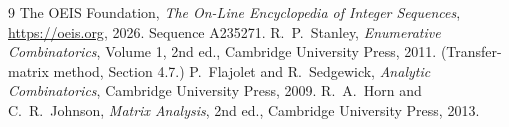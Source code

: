 \documentclass[11pt,a4paper]{article}
\theoremstyle{plain}
\theoremstyle{definition}
\begin{document}
\begin{thebibliography}{9}
 The OEIS Foundation, \emph{The On-Line Encyclopedia of Integer
Sequences}, \url{https://oeis.org}, 2026. Sequence A235271.
 R.~P.~Stanley, \emph{Enumerative Combinatorics}, Volume 1, 2nd ed.,
Cambridge University Press, 2011. (Transfer-matrix method, Section 4.7.)
 P.~Flajolet and R.~Sedgewick, \emph{Analytic Combinatorics}, Cambridge
University Press, 2009.
 R.~A.~Horn and C.~R.~Johnson, \emph{Matrix Analysis}, 2nd ed., Cambridge
University Press, 2013.
\end{thebibliography}
\end{document}
